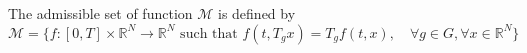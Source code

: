 \documentclass[a4paper,10pt]{article}
\theoremstyle{definition} %
\theoremstyle{definition} %
\newtheorem{proposition}[definition]{Proposition}
\theoremstyle{definition} %
\theoremstyle{definition} %
\newcommand{\R}{\mathbb{R}}
\newcommand{\0}{\boldsymbol{0}}
\begin{document}

The admissible set of function $\mathcal{M}$ is defined by
\begin{equation*}
    \mathcal{M} = \{f:[0,T]\times \R^N \rightarrow \R^N \text{ such that } f(t,T_g x) = T_g f(t,x), \quad \forall g\in G,\forall x\in \R^N \}
\end{equation*}
\end{document}
